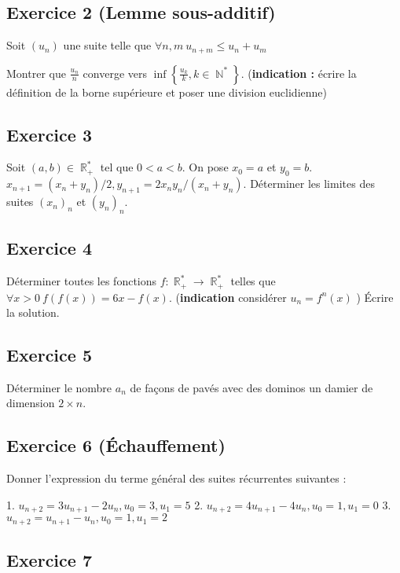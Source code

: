 \documentclass{article}
\DeclareMathOperator{\R}{\mathbb{R}}
\DeclareMathOperator{\N}{\mathbb{N}}
\begin{document}
\subsection*{Exercice 2 (Lemme sous-additif)} 

Soit $(u_n)$ une suite telle que $\forall n, m \ u_{n+m} \leqslant u_n + u_m$ 

Montrer que $ \displaystyle \frac{u_n}{n}$ converge vers $\displaystyle \inf \left\{\frac{u_k}{k}, k \in \N^*\right\}$. (\textbf{indication :} écrire la définition de la borne supérieure et poser une division euclidienne) 

\subsection*{Exercice 3} 

Soit $(a, b) \in \R_+^*$ tel que $0 < a < b$. On pose $x_0 = a$ et $y_0 = b$. $x_{n+1} = (x_n+y_n)/2, y_{n+1} = 2x_ny_n/(x_n+y_n)$. Déterminer les limites des suites $(x_n)_n$ et $(y_n)_n$. 

\subsection*{Exercice 4} 

Déterminer toutes les fonctions $f : \R_+^* \to \R_+^*$ telles que $\forall x > 0 \ f(f(x)) = 6x - f(x)$. (\textbf{indication} considérer $u_n = f^n(x)$ ) Écrire la solution. 

\subsection*{Exercice 5} 

Déterminer le nombre $a_n$ de façons de pavés avec des dominos un damier de dimension $2\times n$. 

\subsection*{Exercice 6 (Échauffement)} 

Donner l'expression du terme général des suites récurrentes suivantes : 

1. $u_{n+2} = 3u_{n+1} - 2u_n, u_0 = 3, u_1 = 5$ 
2. $u_{n+2} = 4u_{n+1} - 4u_n, u_0 = 1, u_1 = 0$ 
3. $u_{n+2} = u_{n+1} - u_n, u_0 = 1, u_1 = 2$ 

\subsection*{Exercice 7} 
\end{document}
